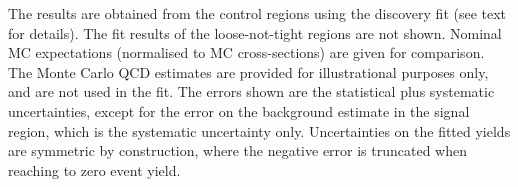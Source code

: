 \begin{table}
{The results are obtained from the control regions using the discovery fit (see text for details). The fit results of the loose-not-tight regions are not shown.
Nominal MC expectations (normalised to MC cross-sections) are given for comparison. 
The Monte Carlo QCD estimates are provided for illustrational purposes only, and are not used in the fit.
The errors shown are the statistical plus systematic uncertainties, except for the error on the background estimate in the signal region, which is the systematic uncertainty only.
Uncertainties on the fitted yields are symmetric by construction, 
where the negative error is truncated when reaching to zero event yield.
}
\label{table.results.systematics.in.logL.fit.table.results.yields}
\end{table}
%